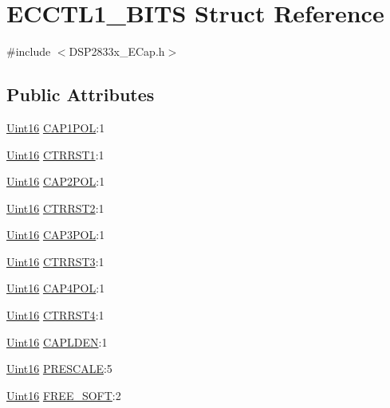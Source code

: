 \hypertarget{struct_e_c_c_t_l1___b_i_t_s}{}\section{E\+C\+C\+T\+L1\+\_\+\+B\+I\+T\+S Struct Reference}
\label{struct_e_c_c_t_l1___b_i_t_s}


{\ttfamily \#include $<$D\+S\+P2833x\+\_\+\+E\+Cap.\+h$>$}

\subsection*{Public Attributes}
\begin{DoxyCompactItemize}
\item 
\hyperlink{_d_s_p2833x___device_8h_a59a9f6be4562c327cbfb4f7e8e18f08b}{Uint16} \hyperlink{struct_e_c_c_t_l1___b_i_t_s_a94f4047f64935d56428dbd9596d56138}{C\+A\+P1\+P\+O\+L}\+:1
\item 
\hyperlink{_d_s_p2833x___device_8h_a59a9f6be4562c327cbfb4f7e8e18f08b}{Uint16} \hyperlink{struct_e_c_c_t_l1___b_i_t_s_aee503cfff7ced8f3b06596249d6d7732}{C\+T\+R\+R\+S\+T1}\+:1
\item 
\hyperlink{_d_s_p2833x___device_8h_a59a9f6be4562c327cbfb4f7e8e18f08b}{Uint16} \hyperlink{struct_e_c_c_t_l1___b_i_t_s_a9e878df10ce215f351606238448633ab}{C\+A\+P2\+P\+O\+L}\+:1
\item 
\hyperlink{_d_s_p2833x___device_8h_a59a9f6be4562c327cbfb4f7e8e18f08b}{Uint16} \hyperlink{struct_e_c_c_t_l1___b_i_t_s_a1c1ce2b561c5e83af44b049bcd37fa37}{C\+T\+R\+R\+S\+T2}\+:1
\item 
\hyperlink{_d_s_p2833x___device_8h_a59a9f6be4562c327cbfb4f7e8e18f08b}{Uint16} \hyperlink{struct_e_c_c_t_l1___b_i_t_s_aea28a992f2d7b073f816fc518c54d69e}{C\+A\+P3\+P\+O\+L}\+:1
\item 
\hyperlink{_d_s_p2833x___device_8h_a59a9f6be4562c327cbfb4f7e8e18f08b}{Uint16} \hyperlink{struct_e_c_c_t_l1___b_i_t_s_a3709cf2a23fd835fd10e5deeae171506}{C\+T\+R\+R\+S\+T3}\+:1
\item 
\hyperlink{_d_s_p2833x___device_8h_a59a9f6be4562c327cbfb4f7e8e18f08b}{Uint16} \hyperlink{struct_e_c_c_t_l1___b_i_t_s_a2b024101df33249c4ade9fb94f5cd891}{C\+A\+P4\+P\+O\+L}\+:1
\item 
\hyperlink{_d_s_p2833x___device_8h_a59a9f6be4562c327cbfb4f7e8e18f08b}{Uint16} \hyperlink{struct_e_c_c_t_l1___b_i_t_s_a856b9e8c71efcd3a46c8ae4ab41e5676}{C\+T\+R\+R\+S\+T4}\+:1
\item 
\hyperlink{_d_s_p2833x___device_8h_a59a9f6be4562c327cbfb4f7e8e18f08b}{Uint16} \hyperlink{struct_e_c_c_t_l1___b_i_t_s_a8d904ef611ec2cb9caab24349d91a2e8}{C\+A\+P\+L\+D\+E\+N}\+:1
\item 
\hyperlink{_d_s_p2833x___device_8h_a59a9f6be4562c327cbfb4f7e8e18f08b}{Uint16} \hyperlink{struct_e_c_c_t_l1___b_i_t_s_a3d52ff7e82a942c1fd1b0b1557b7ef76}{P\+R\+E\+S\+C\+A\+L\+E}\+:5
\item 
\hyperlink{_d_s_p2833x___device_8h_a59a9f6be4562c327cbfb4f7e8e18f08b}{Uint16} \hyperlink{struct_e_c_c_t_l1___b_i_t_s_a6aee455b23fcba9d3f3957e075c14120}{F\+R\+E\+E\+\_\+\+S\+O\+F\+T}\+:2
\end{DoxyCompactItemize}


